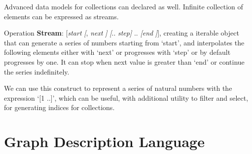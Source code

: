 \documentclass[11pt, a4paper]{report}
\begin{document}
Advanced data models for collections can declared as well. Infinite collection of elements can be expressed as streams.

Operation \textbf{Stream}: [\textit{start} \textit[, \textit{next} \textit] \textbf{\textbar}
\textit[.. \textit{step}\textit] .. \textit[\textit{end} \textit]], creating a iterable object that can generate a series of numbers starting from `start', and interpolates the following elements either with `next' or progresses with `step' or by default progresses by one. It can stop when next value is greater than `end' or continue the series indefinitely.

We can use this construct to represent a series of natural numbers with the expression `[1 ..]', which can be useful, with additional utility to filter and select, for generating indices for collections.
\section{Graph Description Language}
\end{document}
